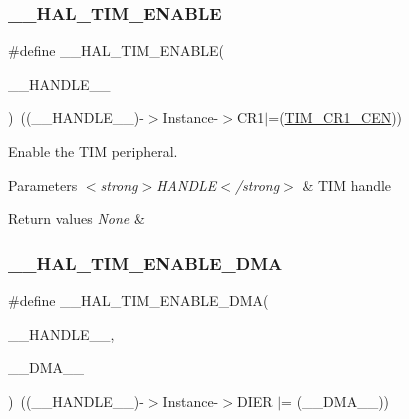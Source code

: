 \subsubsection{\texorpdfstring{\+\_\+\+\_\+\+H\+A\+L\+\_\+\+T\+I\+M\+\_\+\+E\+N\+A\+B\+LE}{\_\_HAL\_TIM\_ENABLE}}
{\footnotesize\ttfamily \#define \+\_\+\+\_\+\+H\+A\+L\+\_\+\+T\+I\+M\+\_\+\+E\+N\+A\+B\+LE(\begin{DoxyParamCaption}\item[{}]{\+\_\+\+\_\+\+H\+A\+N\+D\+L\+E\+\_\+\+\_\+ }\end{DoxyParamCaption})~((\+\_\+\+\_\+\+H\+A\+N\+D\+L\+E\+\_\+\+\_\+)-\/$>$Instance-\/$>$C\+R1$\vert$=(\hyperlink{group___peripheral___registers___bits___definition_ga93d86355e5e3b399ed45e1ca83abed2a}{T\+I\+M\+\_\+\+C\+R1\+\_\+\+C\+EN}))}



Enable the T\+IM peripheral. 


\begin{DoxyParams}{Parameters}
{\em $<$strong$>$\+H\+A\+N\+D\+L\+E$<$/strong$>$} & T\+IM handle \\
\hline
\end{DoxyParams}

\begin{DoxyRetVals}{Return values}
{\em None} & \\
\hline
\end{DoxyRetVals}
\mbox{\label{group___t_i_m___exported___macros_gabb91ccd46cd7204c87170a1ea5b38135}} 
\subsubsection{\texorpdfstring{\+\_\+\+\_\+\+H\+A\+L\+\_\+\+T\+I\+M\+\_\+\+E\+N\+A\+B\+L\+E\+\_\+\+D\+MA}{\_\_HAL\_TIM\_ENABLE\_DMA}}
{\footnotesize\ttfamily \#define \+\_\+\+\_\+\+H\+A\+L\+\_\+\+T\+I\+M\+\_\+\+E\+N\+A\+B\+L\+E\+\_\+\+D\+MA(\begin{DoxyParamCaption}\item[{}]{\+\_\+\+\_\+\+H\+A\+N\+D\+L\+E\+\_\+\+\_\+,  }\item[{}]{\+\_\+\+\_\+\+D\+M\+A\+\_\+\+\_\+ }\end{DoxyParamCaption})~((\+\_\+\+\_\+\+H\+A\+N\+D\+L\+E\+\_\+\+\_\+)-\/$>$Instance-\/$>$D\+I\+ER $\vert$= (\+\_\+\+\_\+\+D\+M\+A\+\_\+\+\_\+))}



